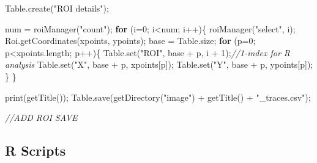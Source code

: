 \documentclass[
  12pt,
  a4paper,
]{book}
\newenvironment{Shaded}{}{}
\newcommand{\CommentTok}[1]{\textcolor[rgb]{0.38,0.63,0.69}{\textit{#1}}}
\newcommand{\ControlFlowTok}[1]{\textcolor[rgb]{0.00,0.44,0.13}{\textbf{#1}}}
\newcommand{\DecValTok}[1]{\textcolor[rgb]{0.25,0.63,0.44}{#1}}
\newcommand{\NormalTok}[1]{#1}
\newcommand{\OperatorTok}[1]{\textcolor[rgb]{0.40,0.40,0.40}{#1}}
\newcommand{\StringTok}[1]{\textcolor[rgb]{0.25,0.44,0.63}{#1}}
\begin{document}
\begin{Shaded}
\begin{Highlighting}[]
\NormalTok{Table}\OperatorTok{.}\NormalTok{create}\OperatorTok{(}\StringTok{"ROI details"}\OperatorTok{);}

\NormalTok{num }\OperatorTok{=}\NormalTok{ roiManager}\OperatorTok{(}\StringTok{"count"}\OperatorTok{);}
\ControlFlowTok{for} \OperatorTok{(}\NormalTok{i}\OperatorTok{=}\DecValTok{0}\OperatorTok{;}\NormalTok{ i}\OperatorTok{\textless{}}\NormalTok{num}\OperatorTok{;}\NormalTok{ i}\OperatorTok{++)\{}
\NormalTok{    roiManager}\OperatorTok{(}\StringTok{"select"}\OperatorTok{,}\NormalTok{ i}\OperatorTok{);}
\NormalTok{    Roi}\OperatorTok{.}\NormalTok{getCoordinates}\OperatorTok{(}\NormalTok{xpoints}\OperatorTok{,}\NormalTok{ ypoints}\OperatorTok{);}
\NormalTok{    base }\OperatorTok{=}\NormalTok{ Table}\OperatorTok{.}\NormalTok{size}\OperatorTok{;}
    \ControlFlowTok{for} \OperatorTok{(}\NormalTok{p}\OperatorTok{=}\DecValTok{0}\OperatorTok{;}\NormalTok{ p}\OperatorTok{\textless{}}\NormalTok{xpoints}\OperatorTok{.}\NormalTok{length}\OperatorTok{;}\NormalTok{ p}\OperatorTok{++)\{}
\NormalTok{        Table}\OperatorTok{.}\NormalTok{set}\OperatorTok{(}\StringTok{"ROI"}\OperatorTok{,}\NormalTok{ base }\OperatorTok{+}\NormalTok{ p}\OperatorTok{,}\NormalTok{ i }\OperatorTok{+} \DecValTok{1}\OperatorTok{);}\CommentTok{//1{-}index for R analysis}
\NormalTok{        Table}\OperatorTok{.}\NormalTok{set}\OperatorTok{(}\StringTok{"X"}\OperatorTok{,}\NormalTok{ base }\OperatorTok{+}\NormalTok{ p}\OperatorTok{,}\NormalTok{ xpoints}\OperatorTok{[}\NormalTok{p}\OperatorTok{]);}
\NormalTok{        Table}\OperatorTok{.}\NormalTok{set}\OperatorTok{(}\StringTok{"Y"}\OperatorTok{,}\NormalTok{ base }\OperatorTok{+}\NormalTok{ p}\OperatorTok{,}\NormalTok{ ypoints}\OperatorTok{[}\NormalTok{p}\OperatorTok{]);}
    \OperatorTok{\}}
\OperatorTok{\}}

\NormalTok{print}\OperatorTok{(}\NormalTok{getTitle}\OperatorTok{());}
\NormalTok{Table}\OperatorTok{.}\NormalTok{save}\OperatorTok{(}\NormalTok{getDirectory}\OperatorTok{(}\StringTok{"image"}\OperatorTok{)} \OperatorTok{+}\NormalTok{ getTitle}\OperatorTok{()} \OperatorTok{+} \StringTok{"\_traces.csv"}\OperatorTok{);}

\CommentTok{//ADD ROI SAVE}
\end{Highlighting}
\end{Shaded}

\subsection{R Scripts}\label{r-scripts}
\end{document}
